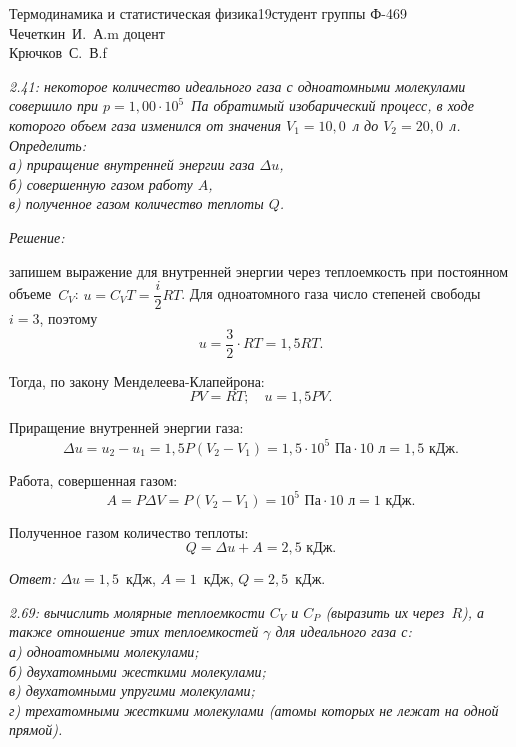 






{Термодинамика и статистическая физика}{}{19}{студент группы Ф-469\\Чечеткин~И.~А.}{m}
{доцент\\Крючков~С.~В.}{f}


\emph{2.41: некоторое количество идеального газа с одноатомными молекулами
совершило при \( p = 1,\!00 \cdot 10^5 \)~Па обратимый изобарический процесс, в
ходе которого объем газа изменился от значения \( V_1 = 10,\!0 \)~л до
\( V_2 = 20,\!0 \)~л.\\Определить:\\
а) приращение внутренней энергии газа \( \Delta u \),\\
б) совершенную газом работу \( A \),\\
в) полученное газом количество теплоты \( Q \).}

\vspace*{2em}
\emph{Решение:}

запишем выражение для внутренней энергии через теплоемкость при постоянном
объеме~\( C_V \): \( u = C_V T = \dfrac{i}{2}RT \). Для одноатомного газа число
степеней свободы \( i = 3 \), поэтому
\[
    u = \frac{3}{2} \cdot RT = 1,\!5 RT.
\]

Тогда, по закону Менделеева-Клапейрона:
\[
    PV = RT; \quad u = 1,\!5 PV.
\]

Приращение внутренней энергии газа:
\[
    \Delta u = u_2 - u_1 = 1,\!5 P(V_2 - V_1) = 1,\!5 \cdot 10^5\text{ Па}
    \cdot 10\text{ л} = 1,\!5\text{ кДж}.
\]

Работа, совершенная газом:
\[
    A = P\Delta V = P(V_2 - V_1) = 10^5\text{ Па} \cdot 10\text{ л} =
    1\text{ кДж}.
\]

Полученное газом количество теплоты:
\[
    Q = \Delta u + A = 2,\!5\text{ кДж}.
\]

\vspace*{2em}
\emph{Ответ:} \( \Delta u = 1,\!5 \)~кДж, \( A = 1 \)~кДж, \( Q = 2,\!5 \)~кДж.

\newpage %

\emph{2.69: вычислить молярные теплоемкости \( C_V \) и \( C_P \)
(выразить их через~\( R \)), а также отношение этих теплоемкостей \( \gamma \)
для идеального газа с:\\
а) одноатомными молекулами;\\
б) двухатомными жесткими молекулами;\\
в) двухатомными упругими молекулами;\\
г) трехатомными жесткими молекулами (атомы которых не лежат на одной прямой).}

